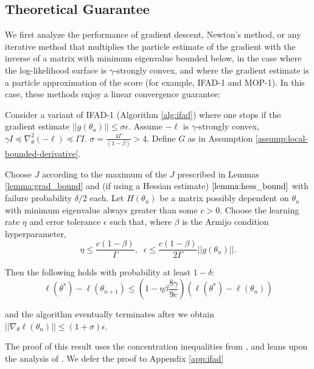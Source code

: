 \documentclass{article}
\begin{document}
\subsection{Theoretical Guarantee}

We first analyze the performance of gradient descent, Newton's method, or any iterative method that multiplies the particle estimate of the gradient with the inverse of a matrix with minimum eigenvalue bounded below, in the case where the log-likelihood surface is $\gamma$-strongly convex, and where the gradient estimate is a particle approximation of the score (for example, IFAD-1 and MOP-1). In this case, these methods enjoy a linear convergence guarantee:

\begin{thm}
\label{thm:convergence}

Consider a variant of IFAD-1 (Algorithm \ref{alg:ifad}) where one stops if the gradient estimate $||g(\theta_n)|| \leq \sigma \epsilon$. Assume $-\ell$ is $\gamma$-strongly convex, $\gamma I \preceq \nabla_\theta^2 (-\ell) \preceq \Gamma I$. $\sigma = \frac{4 \Gamma}{(1-\beta)}> 4$. Define $G$ as in Assumption \ref{assump:local-bounded-derivative}.

Choose $J$ according to the maximum of the $J$ prescribed in Lemmas \ref{lemma:grad_bound} and (if using a Hessian estimate) $\ref{lemma:hess_bound}$ with failure probability $\delta/2$ each. Let $H(\theta_n)$ be a matrix possibly dependent on $\theta_n$ with minimum eigenvalue always greater than some $c>0$. Choose the learning rate $\eta$ and error tolerance $\epsilon$ such that, where $\beta$ is the Armijo condition hyperparameter,
\begin{equation}
    \eta \leq \frac{c(1-\beta)}{\Gamma}, \;\; \epsilon \leq \frac{c(1-\beta)}{2\Gamma}||g(\theta_n)||.
\end{equation}

Then the following holds with probability at least $1-\delta$:
\begin{equation}
\ell(\theta^*) - \ell(\theta_{n+1}) \leq \left(1-\eta\beta\frac{8\gamma}{9c}\right)(\ell(\theta^*)-\ell(\theta_n))
\end{equation}

and the algorithm eventually terminates after we obtain $||\nabla_\theta \ell(\theta_n)|| \leq (1+\sigma) \epsilon$.
\end{thm}

The proof of this result uses the concentration inequalities from \cite{delmoral2011ci}, and leans upon the analysis of \cite{mahoney2016subsampled}. We defer the proof to Appendix \ref{app:ifad}
\end{document}
